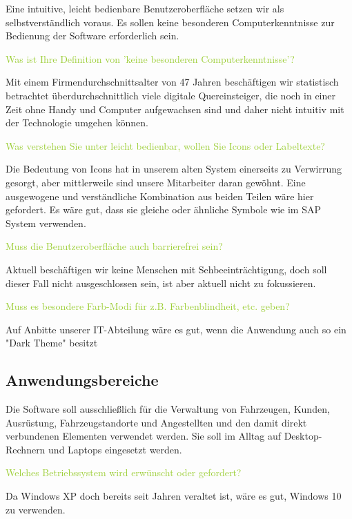 Eine intuitive, leicht bedienbare Benutzeroberfläche setzen wir als selbstverständlich voraus. 
Es sollen keine besonderen Computerkenntnisse zur Bedienung der Software erforderlich sein.  

\textcolor{YellowGreen}{Was ist Ihre Definition von 'keine besonderen Computerkenntnisse'?}

\textcolor{NavyBlue}{Mit einem Firmendurchschnittsalter von 47 Jahren beschäftigen wir statistisch betrachtet überdurchschnittlich viele digitale Quereinsteiger, die noch in einer Zeit ohne Handy und Computer aufgewachsen sind und daher nicht intuitiv mit der Technologie umgehen können. }

\textcolor{YellowGreen}{Was verstehen Sie unter leicht bedienbar, wollen Sie Icons oder Labeltexte?}

\textcolor{NavyBlue}{Die Bedeutung von Icons hat in unserem alten System einerseits zu Verwirrung gesorgt, aber mittlerweile sind unsere Mitarbeiter daran gewöhnt. Eine ausgewogene und verständliche Kombination aus beiden Teilen wäre hier gefordert. Es wäre gut, dass sie gleiche oder ähnliche Symbole wie im SAP System verwenden.}

\textcolor{YellowGreen}{Muss die Benutzeroberfläche auch barrierefrei sein?}

\textcolor{NavyBlue}{Aktuell beschäftigen wir keine Menschen mit Sehbeeinträchtigung, doch soll dieser Fall nicht ausgeschlossen sein, ist aber aktuell nicht zu fokussieren.}

\textcolor{YellowGreen}{Muss es besondere Farb-Modi für z.B. Farbenblindheit, etc. geben?}

\textcolor{NavyBlue}{Auf Anbitte unserer IT-Abteilung wäre es gut, wenn die Anwendung auch so ein "Dark Theme" besitzt}

\subsection{Anwendungsbereiche}

Die Software soll ausschließlich für die Verwaltung von Fahrzeugen, Kunden, Ausrüstung, Fahrzeugstandorte und Angestellten und den damit direkt verbundenen Elementen verwendet werden. 
Sie soll im Alltag auf Desktop-Rechnern und Laptops eingesetzt werden.  

\textcolor{YellowGreen}{Welches Betriebssystem wird erwünscht oder gefordert?}

\textcolor{NavyBlue}{Da Windows XP doch bereits seit Jahren veraltet ist, wäre es gut, Windows 10 zu verwenden.}

